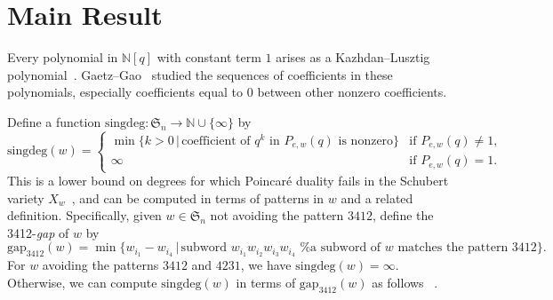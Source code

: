 \documentclass[12pt]{amsart}
\theoremstyle{definition}
\numberwithin{equation}{section}
\newcommand{\sn}{\mathfrak{S}_n}
\newcommand{\mfs}[1]{\mathfrak{S}_{#1}}
\newcommand{\pgap}{\mathrm{gap_{3412}}}
\newcommand{\singdeg}{\mathrm{singdeg}}
\newcommand{\avoidingp}{avoiding the patterns $3412$ and $4231${}}
\begin{document}
\section{Main Result}\label{s:nofactor}

Every polynomial in $\mathbb N[q]$ with constant term $1$ arises as a Kazhdan--Lusztig polynomial~\cite{PoloConstrArb}.  Gaetz--Gao~\cite{GGMinPower} studied the sequences of coefficients in these polynomials, especially coefficients equal to %
$0$ 
between other
nonzero coefficients.

Define a function $\singdeg: \sn \rightarrow \mathbb N \cup \{\infty\}$ by
\begin{equation}\label{eq:gammadef}
\singdeg(w) = \begin{cases}
    \min\{ k > 0 \,|\, 
    \text{coefficient of $q^k$ in $P_{e,w}(q)$ is nonzero}\} 
    &\text{if $P_{e,w}(q) \neq 1$},\\
    \infty &\text{if $P_{e,w}(q) = 1$}.
    \end{cases}    
\end{equation}
This is %
a lower bound on degrees for which
Poincar\'e duality fails in the Schubert variety $X_w$~\cite{KLSchub}, and can be computed in terms of patterns in $w$ and a related definition.
Specifically, given $w \in \sn$
not avoiding the pattern $3412$,
define the %
3412-{\em gap} of $w$
by
\begin{equation}\label{eq:cortezgap}
\pgap(w) = \min\{ w_{i_1} - w_{i_4} \,|\, \text{subword $w_{i_1} w_{i_2} w_{i_3} w_{i_4}$ 
matches the pattern $3412$} \}.
\end{equation}
For $w$ \avoidingp, we have $\singdeg(w) = \infty$.  Otherwise, we can compute $\singdeg(w)$ in terms of $\pgap(w)$ as follows
~\cite[Thm.\,1.6]{GGMinPower}.
\end{document}
